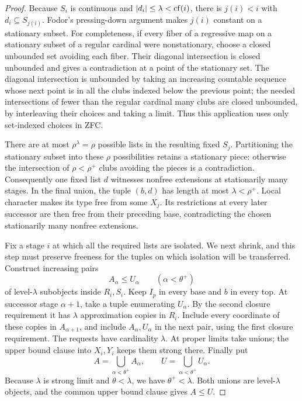 \begin{proof}
Because $S_i$ is continuous and $|d_i|\leq\lambda<\operatorname{cf}(i)$, there is
$j(i)<i$ with $d_i\subseteq S_{j(i)}$. Fodor's pressing-down argument \cite{Fodor1956} makes
$j(i)$ constant on a stationary subset. For completeness, if every
fiber of a regressive map on a stationary subset of a regular cardinal
were nonstationary, choose a closed unbounded set avoiding each fiber.
Their diagonal intersection is closed unbounded and gives a
contradiction at a point of the stationary set. The diagonal
intersection is unbounded by taking an increasing countable sequence
whose next point is in all the clubs indexed below the previous point;
the needed intersections of fewer than the regular cardinal many clubs
are closed unbounded, by interleaving their choices and taking a
limit. Thus this application uses only set-indexed choices in ZFC.

There are at most $\rho^\lambda=\rho$ possible lists in the resulting
fixed $S_j$. Partitioning the stationary subset into these $\rho$
possibilities retains a stationary piece: otherwise the intersection
of $\rho<\rho^+$ clubs avoiding the pieces is a contradiction.
Consequently one fixed list $d$ witnesses nonfree extensions at
stationarily many stages. In the final union, the tuple $(b,d)$ has
length at most $\lambda<\rho^+$. Local character makes its type
free from some $X_j$. Its restrictions at every later successor are
then free from their preceding base, contradicting the chosen
stationarily many nonfree extensions.

Fix a stage $i$ at which all the required lists are isolated. We next
shrink, and this step must preserve freeness for the tuples on which
isolation will be transferred. Construct increasing pairs
\[
 A_\alpha\leq U_\alpha\qquad(\alpha<\theta^+)
\]
of level-$\lambda$ subobjects inside $R_i,S_i$. Keep $I_p$ in every
base and $b$ in every top. At successor stage $\alpha+1$, take a tuple
enumerating $U_\alpha$. By the second closure requirement it has
$\lambda$ approximation copies in $R_i$. Include every coordinate
of these copies in $A_{\alpha+1}$, and include $A_\alpha,U_\alpha$
in the next pair, using the first closure requirement. The requests
have cardinality $\lambda$. At proper limits take unions; the upper
bound clause into $X_i,Y_i$ keeps them strong there. Finally put
\[
 A=\bigcup_{\alpha<\theta^+}A_\alpha,
 \qquad U=\bigcup_{\alpha<\theta^+}U_\alpha.
\]
Because $\lambda$ is strong limit and $\theta<\lambda$, we have
$\theta^+<\lambda$. Both unions are level-$\lambda$ objects, and
the common upper bound clause gives $A\leq U$.


\end{proof}

